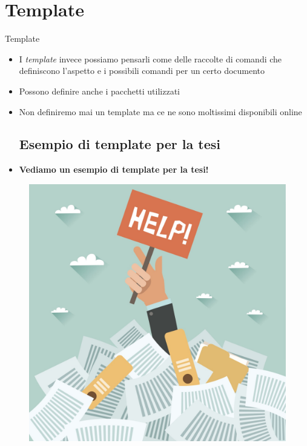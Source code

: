 \section{Template}
\begin{frame}{Template}

\begin{itemize}
\item I \emph{template} invece possiamo pensarli come delle raccolte di comandi
che definiscono l'aspetto e i possibili comandi per un certo documento
\item Possono definire anche i pacchetti utilizzati
\item Non definiremo mai un template ma ce ne sono moltissimi disponibili online
    \subsection{Esempio di template per la tesi}
\item \textbf{Vediamo un esempio di template per la tesi!}
\end{itemize}

\begin{figure}
	\centering
	\includegraphics[scale=0.20]{res/images/template}
\end{figure}

\end{frame}
